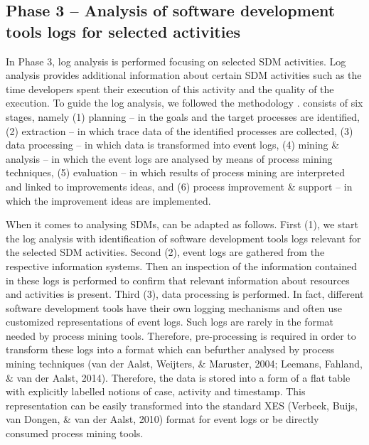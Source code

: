 \subsection{Phase 3 – Analysis of software development tools logs for selected activities}

In Phase 3, log analysis is performed focusing on selected SDM activities. Log analysis
provides additional information about certain SDM activities such as the time developers spent their
execution of this activity and the quality of the execution. To guide the log analysis, we followed the
\pmsquare methodology \citep{DBLP:conf/caise/EckLLA15}. \pmsquare consists of six stages, namely
(1) planning – in the goals and the target processes are identified, (2) extraction – in which trace data
of the identified processes are collected, (3) data processing – in which data is transformed into
event logs, (4) mining \& analysis – in which the event logs are analysed by means of process mining
techniques, (5) evaluation – in which results of process mining are interpreted and linked to
improvements ideas, and (6) process improvement \& support – in which the improvement ideas are
implemented.

When it comes to analysing SDMs, \pmsquare can be adapted as follows. First (1), we start the log
analysis with identification of software development tools logs relevant for the selected SDM
activities. Second (2), event logs are gathered from the respective information systems. Then an
inspection of the information contained in these logs is performed to confirm that relevant
information about resources and activities is present. Third (3), data processing is performed. In fact,
different software development tools have their own logging mechanisms and often use customized
representations of event logs. Such logs are rarely in the format needed by process mining tools.
Therefore, pre-processing is required in order to transform these logs into a format which can befurther analysed by process mining techniques (van der Aalst, Weijters, \& Maruster, 2004; Leemans,
Fahland, \& van der Aalst, 2014). Therefore, the data is stored into a form of a flat table with explicitly
labelled notions of case, activity and timestamp. This representation can be easily transformed into
the standard XES (Verbeek, Buijs, van Dongen, \& van der Aalst, 2010) format for event logs or be
directly consumed process mining tools.

